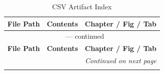 \begin{small}
\begin{longtable}{@{}p{3.8cm}p{4.2cm}p{3.2cm}@{}}
\caption{CSV Artifact Index} \label{tab:artifact-csv} \\
\toprule
\textbf{File Path} & \textbf{Contents} & \textbf{Chapter / Fig / Tab} \\
\midrule
\endfirsthead

\multicolumn{3}{c}{\tablename\ \thetable{} --- continued} \\
\toprule
\textbf{File Path} & \textbf{Contents} & \textbf{Chapter / Fig / Tab} \\
\midrule
\endhead

\midrule
\multicolumn{3}{r}{\textit{Continued on next page}} \\
\endfoot

\bottomrule
\endlastfoot


\end{longtable}
\end{small}
